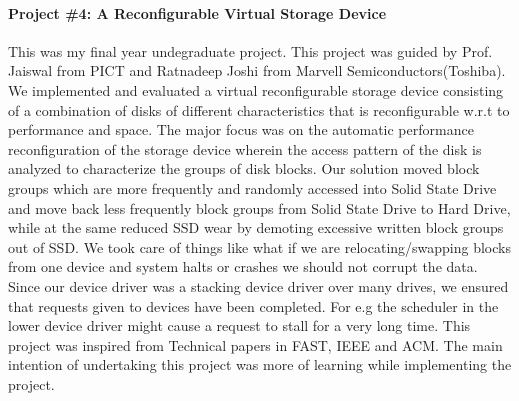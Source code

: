 \documentclass[letterpaper]{article}
\begin{document}
\paragraph{Project \#4: A Reconfigurable Virtual Storage Device}
This was my final year undegraduate project. This project was guided by Prof. Jaiswal from PICT and Ratnadeep Joshi from Marvell Semiconductors(Toshiba).
We implemented and evaluated a virtual reconfigurable storage device consisting of a combination of disks of different 
characteristics that is reconfigurable w.r.t to performance and space. The major focus was on the automatic performance reconfiguration 
of the storage device wherein the access pattern of the disk is analyzed to characterize the groups of disk blocks. 
Our solution moved block groups which are more frequently and randomly accessed into Solid State Drive and move back less frequently block 
groups from Solid State Drive to Hard Drive, while at the same reduced SSD wear by demoting excessive written block groups out of SSD. 
We took care of things like what if we are relocating/swapping blocks from one device and system halts or crashes we should not corrupt the data.
Since our device driver was a stacking device driver over many drives, we ensured that requests given to devices have been completed. 
For e.g the scheduler in the lower device driver might cause a request to stall for a very long time. 
This project was inspired from Technical papers in FAST, IEEE and ACM. The main intention of undertaking this project was more 
of learning while implementing the project.
\end{document}
